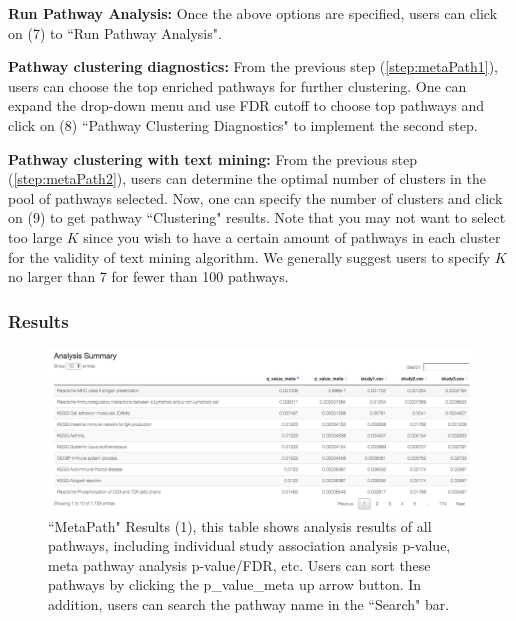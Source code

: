 \begin{steps}
\item \textbf{Run Pathway Analysis:}
\label{step:metaPath1}
Once the above options are specified, users can click on {\color{red}(7)} to ``Run Pathway Analysis".

\item \textbf{Pathway clustering diagnostics:} 
\label{step:metaPath2}
From the previous step (\ref{step:metaPath1}), users can choose the top enriched pathways for further clustering. 
One can expand the drop-down menu and use FDR cutoff to choose top pathways and click on {\color{red}(8)} ``Pathway Clustering Diagnostics" to implement the second step.

\item \textbf{Pathway clustering with text mining:} 
\label{step:metaPath3}
From the previous step (\ref{step:metaPath2}), users can determine the optimal number of clusters in the pool of pathways selected. 
Now, one can specify the number of clusters and click on {\color{red}(9)} to get pathway ``Clustering" results. 
Note that you may not want to select too large $K$ since you wish to have a certain amount of pathways in each cluster for the validity of text mining algorithm. 
We generally suggest users to specify $K$ no larger than 7 for fewer than 100 pathways. 
\end{steps}




\subsubsection{Results}

\begin{figure}[H]
\begin{center}
\includegraphics[scale=0.4]{./figure/metaPath/metaPathresult1.png}
\caption{``MetaPath" Results (1), 
this table shows analysis results of all pathways, 
including individual study association analysis p-value, meta pathway analysis p-value/FDR, etc. 
Users can sort these pathways by clicking the p\_value\_meta up arrow button.
In addition, users can search the pathway  name in the ``Search" bar.
}
\label{fig:MetaPathresult1}
\end{center}
\end{figure}

